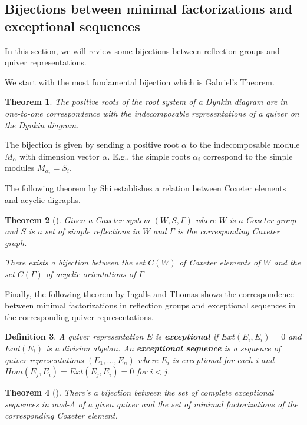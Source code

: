 \documentclass[11pt]{amsart}
\newtheorem{thm}{Theorem}[section]
\newtheorem{defi}[thm]{Definition}%
\begin{document}
\subsection{Bijections between minimal factorizations and exceptional sequences}

In this section, we will review some bijections between reflection groups and quiver representations.

We start with the most fundamental bijection which is Gabriel's Theorem.

\begin{thm}
    The positive roots of the root system of a Dynkin diagram are in one-to-one correspondence with the indecomposable representations of a quiver on the Dynkin diagram.
\end{thm}

The bijection is given by sending a positive root $\alpha$ to the indecomposable module $M_\alpha$ with dimension vector $\alpha$. E.g., the simple roots $\alpha_i$ correspond to the simple modules $M_{\alpha_i}=S_i$.

The following theorem by Shi establishes a relation between Coxeter elements and acyclic digraphs.

\begin{thm}[\cite{article}]
    Given a Coxeter system $(W,S,\Gamma)$ where $W$ is a Coxeter group and $S$ is a set of simple reflections in $W$ and $\Gamma$ is the corresponding Coxeter graph.

    There exists a bijection between the set $C(W)$ of Coxeter elements of $W$ and the set $C(\Gamma)$ of acyclic orientations of $\Gamma$
\end{thm}

Finally, the following theorem by Ingalls and Thomas shows the correspondence between minimal factorizations in reflection groups and exceptional sequences in the corresponding quiver representations.

\begin{defi}
    A quiver representation $E$ is \textbf{exceptional} if $Ext(E_i,E_i)=0$ and $End(E_i)$ is a division algebra.
    An \textbf{exceptional sequence} is a sequence of quiver representations $(E_1,\dots,E_n)$ where $E_i$ is exceptional for each i and $Hom(E_j,E_i)=Ext(E_j,E_i)=0$ for $i<j$.
\end{defi}

\begin{thm}[\cite{ingalls2009noncrossing}]
    There's a bijection between the set of complete exceptional sequences in mod-$\Lambda$ of a given quiver and the set of minimal factorizations of the corresponding Coxeter element.
\end{thm}
\end{document}
